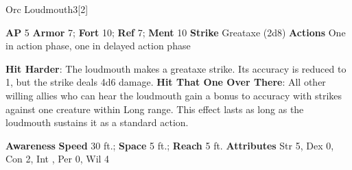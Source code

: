 \begin{monsection}{Orc Loudmouth}{3}[2]
\vspace{-1em}\vspace{-1em}
\begin{spellcontent}
\begin{spelltargetinginfo}
{\textbf{AP} 5}
\pari \textbf{Armor} 7;
\textbf{Fort} 10;
\textbf{Ref} 7;
\textbf{Ment} 10
\pari \textbf{Strike} Greataxe  (2d8)
\pari \textbf{Actions} One in action phase, one in delayed action phase
\end{spelltargetinginfo}
\begin{spelleffects}
\pari
\textbf{Hit Harder}:
The loudmouth makes a greataxe strike.
Its accuracy is reduced to 1, but the strike deals 4d6 damage.
\vspace{0.5em}
\pari
\textbf{Hit That One Over There}:
All other willing allies who can hear the loudmouth gain a  bonus to accuracy with strikes against one creature within Long range.
This effect lasts as long as the loudmouth sustains it as a standard action.
\end{spelleffects}
\end{spellcontent}
\begin{spellsubcontent}
\begin{spellfooter}
\pari \textbf{Awareness} 
\pari \textbf{Speed} 30 ft.;
\textbf{Space} 5 ft.;
\textbf{Reach} 5 ft.
\pari \textbf{Attributes}
Str 5,
Dex 0,
Con 2,
Int ,
Per 0,
Wil 4
\end{spellfooter}
\end{spellsubcontent}
\end{monsection}
